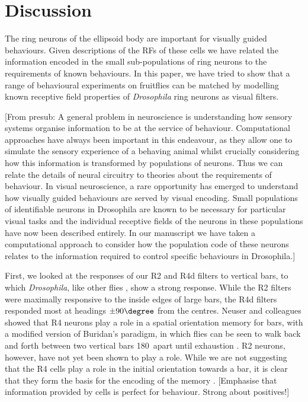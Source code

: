 \section*{Discussion}
The ring neurons of the ellipsoid body are important for visually guided behaviours.
Given descriptions of the \acp{RF} of these cells we have related the information encoded in the small sub-populations of ring neurons to the requirements of known behaviours.
In this paper, we have tried to show that a range of behavioural experiments on fruitflies can be matched by modelling known receptive field properties of \emph{Drosophila} ring neurons as visual filters.

[From presub: A general problem in neuroscience is understanding how sensory systems organise information to be at the service of behaviour. Computational approaches have always been important in this endeavour, as they allow one to simulate the sensory experience of a behaving animal whilst crucially considering how this information is transformed by populations of neurons. Thus we can relate the details of neural circuitry to theories about the requirements of behaviour. In visual neuroscience, a rare opportunity has emerged to understand how visually guided behaviours are served by visual encoding. Small populations of identifiable neurons in Drosophila are known to be necessary for particular visual tasks and the individual receptive fields of the neurons in these populations have now been described entirely. In our manuscript we have taken a computational approach to consider how the population code of these neurons relates to the information required to control specific behaviours in Drosophila.]

First, we looked at the responses of our R2 and R4d filters to vertical bars, to which \emph{Drosophila}, like other flies \cite{Reichardt1969}, show a strong response.
While the R2 filters were maximally responsive to the inside edges of large bars, the R4d filters responded most at headings $\pm90\degree$ from the centres.
Neuser and colleagues \cite{Neuser2008} showed that R4 neurons play a role in a spatial orientation memory for bars, with a modified version of Buridan's paradigm, in which flies can be seen to walk back and forth between two vertical bars 180\degree\ apart until exhaustion \cite{Bulthoff1982}.
R2 neurons, however, have not yet been shown to play a role.
While we are not suggesting that the R4 cells play a role in the initial orientation towards a bar, it is clear that they form the basis for the encoding of the memory \cite{Guo2015,Neuser2008}.
[Emphasise that information provided by cells is perfect for behaviour. Strong about positives!]

